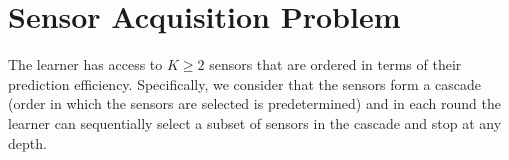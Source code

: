 \documentclass{article}
\begin{document}






\section{Sensor Acquisition Problem}
\label{sec:Setup}
The learner has access to $K\geq 2$ sensors that are ordered in terms of their prediction efficiency. Specifically, we consider that the sensors form a cascade (order in which the sensors are selected is predetermined) and in each round the learner can sequentially select a subset of sensors in the cascade and stop at any depth.  
\end{document}
